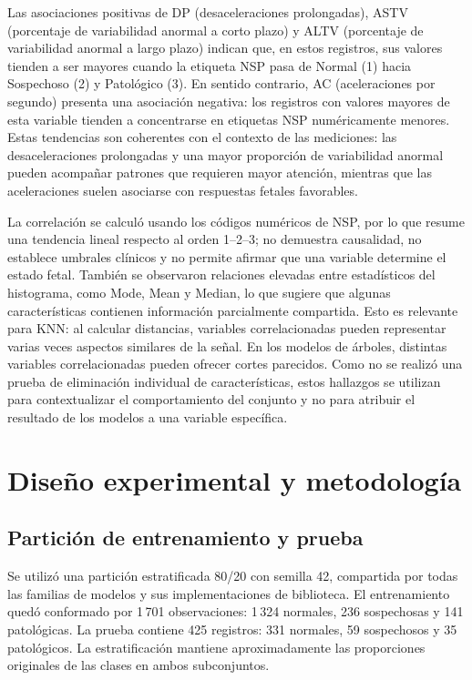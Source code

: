 Las asociaciones positivas de DP (desaceleraciones prolongadas), ASTV (porcentaje de variabilidad anormal a corto plazo) y ALTV (porcentaje de variabilidad anormal a largo plazo) indican que, en estos registros, sus valores tienden a ser mayores cuando la etiqueta NSP pasa de Normal (1) hacia Sospechoso (2) y Patol\'ogico (3). En sentido contrario, AC (aceleraciones por segundo) presenta una asociaci\'on negativa: los registros con valores mayores de esta variable tienden a concentrarse en etiquetas NSP num\'ericamente menores. Estas tendencias son coherentes con el contexto de las mediciones: las desaceleraciones prolongadas y una mayor proporci\'on de variabilidad anormal pueden acompa\~nar patrones que requieren mayor atenci\'on, mientras que las aceleraciones suelen asociarse con respuestas fetales favorables.

La correlaci\'on se calcul\'o usando los c\'odigos num\'ericos de NSP, por lo que resume una tendencia lineal respecto al orden 1--2--3; no demuestra causalidad, no establece umbrales cl\'inicos y no permite afirmar que una variable determine el estado fetal. Tambi\'en se observaron relaciones elevadas entre estad\'isticos del histograma, como Mode, Mean y Median, lo que sugiere que algunas caracter\'isticas contienen informaci\'on parcialmente compartida. Esto es relevante para KNN: al calcular distancias, variables correlacionadas pueden representar varias veces aspectos similares de la se\~nal. En los modelos de \'arboles, distintas variables correlacionadas pueden ofrecer cortes parecidos. Como no se realiz\'o una prueba de eliminaci\'on individual de caracter\'isticas, estos hallazgos se utilizan para contextualizar el comportamiento del conjunto y no para atribuir el resultado de los modelos a una variable espec\'ifica.

\section{Dise\~no experimental y metodolog\'ia}
\subsection{Partici\'on de entrenamiento y prueba}
Se utiliz\'o una partici\'on estratificada 80/20 con semilla 42, compartida por todas las familias de modelos y sus implementaciones de biblioteca. El entrenamiento qued\'o conformado por 1\,701 observaciones: 1\,324 normales, 236 sospechosas y 141 patol\'ogicas. La prueba contiene 425 registros: 331 normales, 59 sospechosos y 35 patol\'ogicos. La estratificaci\'on mantiene aproximadamente las proporciones originales de las clases en ambos subconjuntos.

